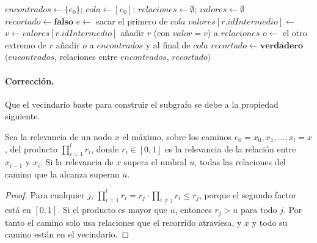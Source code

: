 \begin{algorithm}[htbp]
  \caption{Recorrido del vecindario (\texttt{obtener\_vecindario}).}
  \label{alg:vecindario}
  \begin{algorithmic}[1]
      \State $encontrados \gets \{e_0\}$; $cola \gets [e_0]$; $relaciones \gets \emptyset$; $valores \gets \emptyset$
      \State $recortado \gets \textbf{falso}$
        \State $e \gets$ sacar el primero de $cola$
         
            \State $valores[r.idIntermedio] \gets$ 
          \EndIf
          \State $v \gets valores[r.idIntermedio]$
            \State añadir $r$ (con $valor = v$) a $relaciones$
            \State $o \gets$ el otro extremo de $r$
                \State añadir $o$ a $encontrados$ y al final de $cola$
              \Else
                \State $recortado \gets \textbf{verdadero}$
              \EndIf
            \EndIf
          \EndIf
        \EndFor
      \EndWhile
      \State \Return $(encontrados$, relaciones entre $encontrados$, $recortado)$
    \EndFunction
  \end{algorithmic}
\end{algorithm}

\paragraph{Corrección.} Que el vecindario baste para construir el subgrafo se debe a la propiedad siguiente.

\begin{proposicion}
\label{prop:vecindario}
Sea la relevancia de un nodo $x$ el máximo, sobre los caminos $e_0=x_0,x_1,\dots,x_l=x$, del producto $\prod_{i=1}^{l} r_i$, donde $r_i\in[0,1]$ es la relevancia de la relación entre $x_{i-1}$ y $x_i$. Si la relevancia de $x$ supera el umbral $u$, todas las relaciones del camino que la alcanza superan $u$.
\end{proposicion}

\begin{proof}
Para cualquier $j$, $\prod_{i=1}^{l} r_i = r_j\cdot\prod_{i\neq j} r_i \le r_j$, porque el segundo factor está en $[0,1]$. Si el producto es mayor que $u$, entonces $r_j > u$ para todo $j$. Por tanto el camino solo usa relaciones que el recorrido atraviesa, y $x$ y todo su camino están en el vecindario.
\end{proof}

